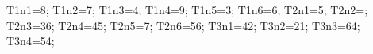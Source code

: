 \documentclass[exercice]{thedocument}%
\begin{document}
%
    \>T1n1=8;%
    \>T1n2=7;%
    \>T1n3=4;%
    \>T1n4=9;%
    \>T1n5=3;%
    \>T1n6=6;%
    \>T2n1=5;%
    \>T2n2=;%
    \>T2n3=36;%
    \>T2n4=45;%
    \>T2n5=7;%
    \>T2n6=56;%
    \>T3n1=42;%
    \>T3n2=21;%
    \>T3n3=64;%
    \>T3n4=54;%
\end{document}
